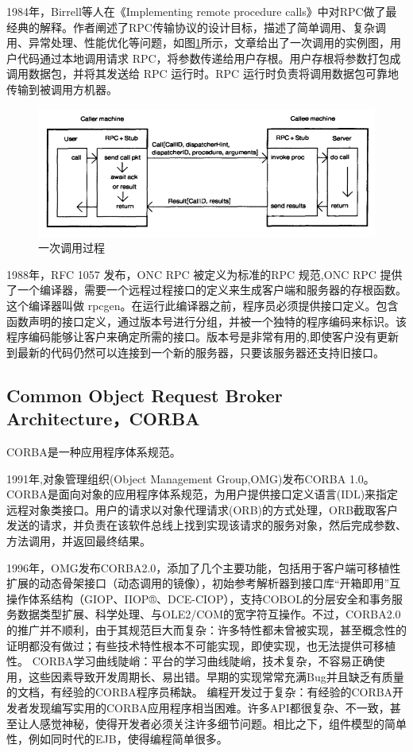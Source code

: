 \documentclass[a4paper,twoside]{scrbook}
\begin{document}
\begin{CJK}{UTF8}{gbsn}
1984年，Birrell\cite{birrell1984implementing}等人在《Implementing remote procedure calls》中对RPC做了最经典的解释。作者阐述了RPC传输协议的设计目标，描述了简单调用、复杂调用、异常处理、性能优化等问题，如图\ref{fig:A simple call}所示，文章给出了一次调用的实例图，用户代码通过本地调用请求 RPC，将参数传递给用户存根。用户存根将参数打包成调用数据包，并将其发送给 RPC 运行时。RPC 运行时负责将调用数据包可靠地传输到被调用方机器。
\begin{figure}[!htbp]
\centering
\includegraphics[width=1\textwidth]{Figures/A simple call.png}
\caption{一次调用过程} 
\label{fig:A simple call}
\end{figure}
1988年，RFC 1057 发布，ONC RPC 被定义为标准的RPC 规范,ONC RPC 提供了一个编译器，需要一个远程过程接口的定义来生成客户端和服务器的存根函数。这个编译器叫做 rpcgen。在运行此编译器之前，程序员必须提供接口定义。包含函数声明的接口定义，通过版本号进行分组，并被一个独特的程序编码来标识。该程序编码能够让客户来确定所需的接口。版本号是非常有用的,即使客户没有更新到最新的代码仍然可以连接到一个新的服务器，只要该服务器还支持旧接口。
\subsection{Common Object Request Broker Architecture，CORBA}
CORBA是一种应用程序体系规范。

1991年,对象管理组织(Object Management Group,OMG)发布CORBA 1.0。CORBA是面向对象的应用程序体系规范，为用户提供接口定义语言(IDL)来指定远程对象类接口。用户的请求以对象代理请求(ORB)的方式处理，ORB截取客户发送的请求，并负责在该软件总线上找到实现该请求的服务对象，然后完成参数、方法调用，并返回最终结果。

1996年，OMG发布CORBA2.0，添加了几个主要功能，包括用于客户端可移植性扩展的动态骨架接口（动态调用的镜像），初始参考解析器到接口库“开箱即用”互操作体系结构（GIOP、IIOP®、DCE-CIOP），支持COBOL的分层安全和事务服务数据类型扩展、科学处理、与OLE2/COM的宽字符互操作。不过，CORBA2.0的推广并不顺利，由于其规范巨大而复杂：许多特性都未曾被实现，甚至概念性的证明都没有做过；有些技术特性根本不可能实现，即使实现，也无法提供可移植性。
CORBA学习曲线陡峭：平台的学习曲线陡峭，技术复杂，不容易正确使用，这些因素导致开发周期长、易出错。早期的实现常常充满Bug并且缺乏有质量的文档，有经验的CORBA程序员稀缺。
编程开发过于复杂：有经验的CORBA开发者发现编写实用的CORBA应用程序相当困难。许多API都很复杂、不一致，甚至让人感觉神秘，使得开发者必须关注许多细节问题。相比之下，组件模型的简单性，例如同时代的EJB，使得编程简单很多。

\end{CJK}
\end{document}
